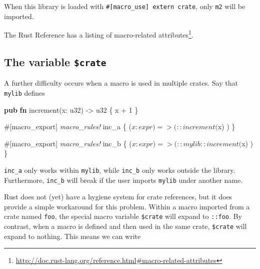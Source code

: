 \documentclass[a4paper,]{book}
\newenvironment{Shaded}{\begin{snugshade}}{\end{snugshade}}
\newcommand{\KeywordTok}[1]{\textcolor[rgb]{0.13,0.29,0.53}{\textbf{{#1}}}}
\newcommand{\DataTypeTok}[1]{\textcolor[rgb]{0.13,0.29,0.53}{{#1}}}
\newcommand{\DecValTok}[1]{\textcolor[rgb]{0.00,0.00,0.81}{{#1}}}
\newcommand{\PreprocessorTok}[1]{\textcolor[rgb]{0.56,0.35,0.01}{\textit{{#1}}}}
\newcommand{\AttributeTok}[1]{\textcolor[rgb]{0.77,0.63,0.00}{{#1}}}
\newcommand{\NormalTok}[1]{{#1}}
\renewcommand{\href}[2]{#2\footnote{\url{#1}}}
\begin{document}
When this library is loaded with
\texttt{\#{[}macro\_use{]}\ extern\ crate}, only \texttt{m2} will be
imported.

The Rust Reference has a
\href{http://doc.rust-lang.org/reference.html\#macro-related-attributes}{listing
of macro-related attributes}.

\subsection{\texorpdfstring{The variable
\texttt{\$crate}}{The variable \$crate}}\label{the-variable-crate}

A further difficulty occurs when a macro is used in multiple crates. Say
that \texttt{mylib} defines

\begin{Shaded}
\begin{Highlighting}[]
\KeywordTok{pub} \KeywordTok{fn} \NormalTok{increment(x: }\DataTypeTok{u32}\NormalTok{) -> }\DataTypeTok{u32} \NormalTok{\{}
    \NormalTok{x + }\DecValTok{1}
\NormalTok{\}}

\AttributeTok{#[}\NormalTok{macro_export}\AttributeTok{]}
\PreprocessorTok{macro_rules!} \NormalTok{inc_a \{}
    \NormalTok{($x:expr) => ( ::increment($x) )}
\NormalTok{\}}

\AttributeTok{#[}\NormalTok{macro_export}\AttributeTok{]}
\PreprocessorTok{macro_rules!} \NormalTok{inc_b \{}
    \NormalTok{($x:expr) => ( ::mylib::increment($x) )}
\NormalTok{\}}
\end{Highlighting}
\end{Shaded}

\texttt{inc\_a} only works within \texttt{mylib}, while \texttt{inc\_b}
only works outside the library. Furthermore, \texttt{inc\_b} will break
if the user imports \texttt{mylib} under another name.

Rust does not (yet) have a hygiene system for crate references, but it
does provide a simple workaround for this problem. Within a macro
imported from a crate named \texttt{foo}, the special macro variable
\texttt{\$crate} will expand to \texttt{::foo}. By contrast, when a
macro is defined and then used in the same crate, \texttt{\$crate} will
expand to nothing. This means we can write

\begin{Shaded}
\end{Shaded}
\end{document}
